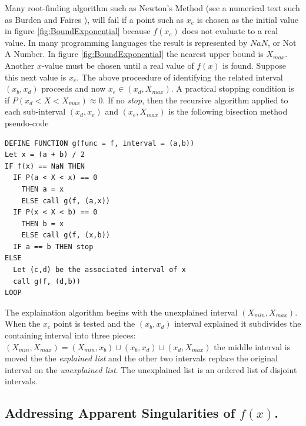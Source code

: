 Many root-finding algorithm such as Newton's Method (see a numerical text such as Burden and Faires \cite{burden01}), will fail if a point such as $x_e$ is chosen as the initial value in figure \ref{fig:BoundExponential} because $f(x_e)$ does not evaluate to a real value. In many programming languages the result is represented by $NaN$, or Not A Number. In figure \ref{fig:BoundExponential} the nearest upper bound is $X_{max}$. Another $x$-value must be chosen until a real value of $f(x)$ is found. Suppose this next value is $x_c$. The above proceedure of identifying the related interval $(x_b, x_d)$ proceeds and now $x_e \in (x_d, X_{max})$. A practical stopping condition is if $P(x_d < X < X_{max}) \approx 0$. If no \emph{stop}, then the recursive algorithm applied to each sub-interval $(x_d, x_e)$ and $(x_e, X_{max})$ is the following bisection method pseudo-code
\begin{lstlisting}
DEFINE FUNCTION g(func = f, interval = (a,b))
Let x = (a + b) / 2
IF f(x) == NaN THEN
  IF P(a < X < x) == 0
    THEN a = x 
    ELSE call g(f, (a,x))
  IF P(x < X < b) == 0 
    THEN b = x
    ELSE call g(f, (x,b))
  IF a == b THEN stop
ELSE
  Let (c,d) be the associated interval of x
  call g(f, (d,b))
LOOP
\end{lstlisting}

The explaination algorithm begins with the unexplained interval $(X_{min}, X_{max})$. When the $x_c$ point is tested and the $(x_b, x_d)$ interval explained it subdivides the containing interval into three pieces: $(X_{min}, X_{max}) = (X_{min}, x_b) \cup (x_b, x_d) \cup (x_d, X_{max})$ the middle interval is moved the the \emph{explained list} and the other two intervals replace the original interval on the \emph{unexplained list}. The unexplained list is an ordered list of disjoint intervals.

\subsection{Addressing Apparent Singularities  of $f(x)$.}


